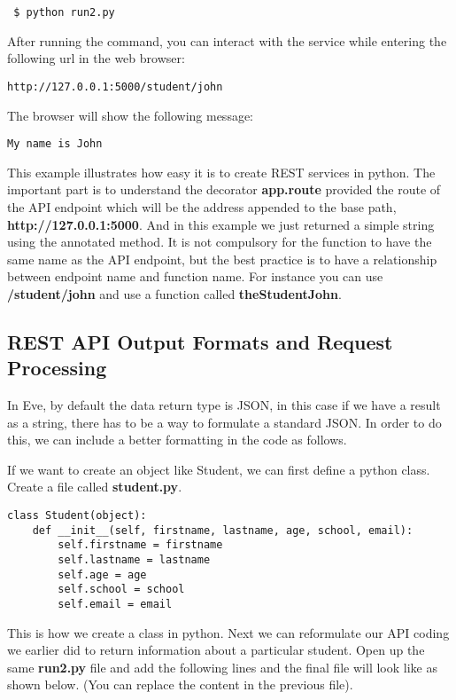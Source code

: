 \begin{lstlisting}
 $ python run2.py
\end{lstlisting}

After running the command, you can interact with the service while
entering the  following url in the web browser:

\begin{lstlisting}
http://127.0.0.1:5000/student/john
\end{lstlisting}

The browser will show the following message:

\begin{lstlisting}
My name is John
\end{lstlisting}

This example illustrates how easy it is to create REST services in
python.  The important part is to understand the decorator
\textbf{app.route} provided the route of the API endpoint which will
be the address appended to the base path,
\textbf{http://127.0.0.1:5000}. And in this example we just returned a
simple string using the annotated method. It is not compulsory
for the function to have the same name as the API endpoint, but the
best practice is to have a relationship between endpoint name and
function name. For instance you can use \textbf{/student/john} and
use a function called \textbf{theStudentJohn}.

\subsection{REST API Output Formats and Request Processing}

In Eve, by default the data return type is JSON, in this case if we have a
result as a string, there has to be a way to formulate a standard JSON. In order
to do this, we can include a better formatting in the code as follows. 

If we want to create an object like Student, we can first define a python class.
Create a file called \textbf{student.py}.

\begin{lstlisting}
class Student(object):
    def __init__(self, firstname, lastname, age, school, email):
        self.firstname = firstname
        self.lastname = lastname
        self.age = age
        self.school = school
        self.email = email

\end{lstlisting}

This is how we create a class in python. Next we can reformulate our API coding
we earlier did to return information about a particular student. Open up the 
same \textbf{run2.py} file and add the following lines and the final
file will look like as shown below. (You can replace the content in the previous
file).

